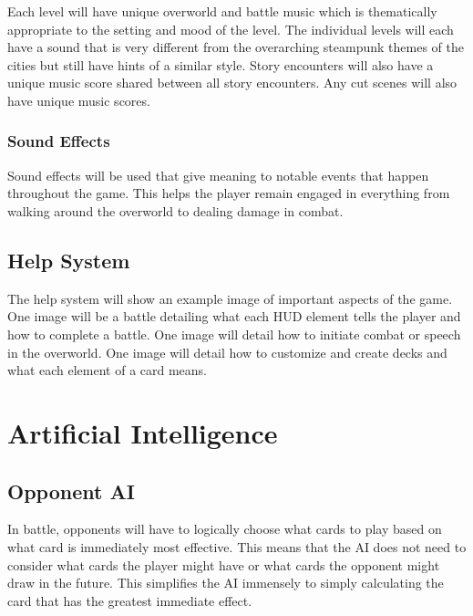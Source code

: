 \documentclass[12pt,titlepage]{article}
\begin{document}
Each level will have unique overworld and battle music which is thematically
appropriate to the setting and mood of the level. The individual levels will
each have a sound that is very different from the overarching steampunk themes
of the cities but still have hints of a similar style. Story encounters will
also have a unique music score shared between all story encounters. Any cut
scenes will also have unique music scores.

\subsubsection{Sound Effects}

Sound effects will be used that give meaning to notable events that happen
throughout the game. This helps the player remain engaged in everything from
walking around the overworld to dealing damage in combat.

\subsection{Help System}

The help system will show an example image of important aspects of the game.
One image will be a battle detailing what each HUD element tells the player and
how to complete a battle. One image will detail how to initiate combat or
speech in the overworld. One image will detail how to customize and create
decks and what each element of a card means.

\newpage
\section{Artificial Intelligence}

\subsection{Opponent AI}

In battle, opponents will have to logically choose what cards to play based on
what card is immediately most effective. This means that the AI does not need
to consider what cards the player might have or what cards the opponent might
draw in the future. This simplifies the AI immensely to simply calculating the
card that has the greatest immediate effect.
\end{document}
